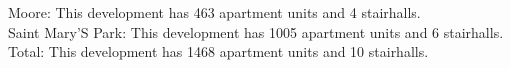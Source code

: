 {Moore}: This development has 463 apartment units and 4 stairhalls.\\{Saint Mary'S Park}: This development has 1005 apartment units and 6 stairhalls.\\{Total}: This development has 1468 apartment units and 10 stairhalls.\\